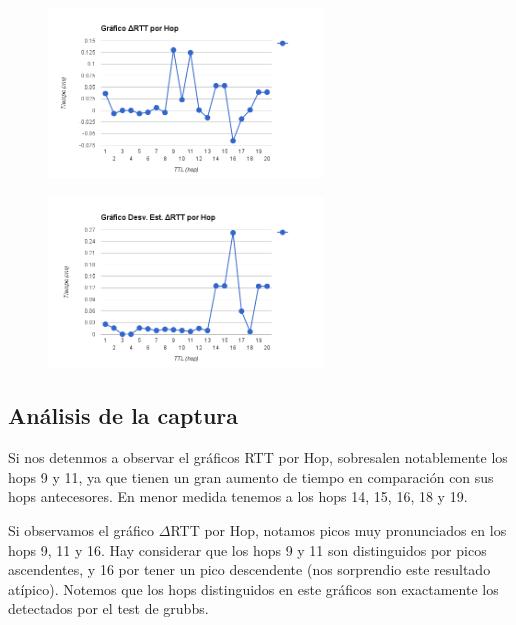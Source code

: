 \begin{figure}[h]
    \includegraphics[width=0.65\textwidth]{img_analisis1/delta_rtt_hop.png}
    
\end{figure}
\vspace{0.25cm}

\begin{figure}[h]
    \includegraphics[width=0.65\textwidth]{img_analisis1/ds_delta_rtt_hop.png}
    
\end{figure}
\vspace{0.25cm}

\newpage

\subsection{An\'alisis de la captura}
Si nos detenmos a observar el gráficos RTT por Hop, sobresalen notablemente los hops 9 y 11, ya que tienen un gran aumento de tiempo en comparación con sus hops antecesores. En menor medida tenemos a los hops 14, 15, 16, 18 y 19.\newline

Si observamos el gráfico $\Delta$RTT por Hop, notamos picos muy pronunciados en los hops 9, 11 y 16. Hay considerar que los hops 9 y 11 son distinguidos por picos ascendentes, y 16 por tener un pico descendente (nos sorprendio este resultado atípico). Notemos que los hops distinguidos en este gráficos son exactamente los detectados por el test de grubbs.\newline

